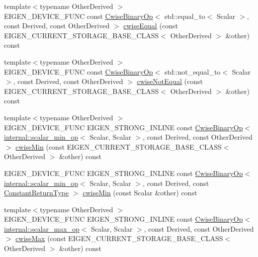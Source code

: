 \begin{DoxyCompactItemize}
\item 
{\footnotesize template$<$typename Other\+Derived $>$ }\\E\+I\+G\+E\+N\+\_\+\+D\+E\+V\+I\+C\+E\+\_\+\+F\+U\+NC const \mbox{\hyperlink{class_eigen_1_1_cwise_binary_op}{Cwise\+Binary\+Op}}$<$ std\+::equal\+\_\+to$<$ Scalar $>$, const Derived, const Other\+Derived $>$ \mbox{\hyperlink{class_eigen_1_1_array_base_a5bce24aa0762399c48cde7777c21c9e2}{cwise\+Equal}} (const E\+I\+G\+E\+N\+\_\+\+C\+U\+R\+R\+E\+N\+T\+\_\+\+S\+T\+O\+R\+A\+G\+E\+\_\+\+B\+A\+S\+E\+\_\+\+C\+L\+A\+SS$<$ Other\+Derived $>$ \&other) const
\item 
{\footnotesize template$<$typename Other\+Derived $>$ }\\E\+I\+G\+E\+N\+\_\+\+D\+E\+V\+I\+C\+E\+\_\+\+F\+U\+NC const \mbox{\hyperlink{class_eigen_1_1_cwise_binary_op}{Cwise\+Binary\+Op}}$<$ std\+::not\+\_\+equal\+\_\+to$<$ Scalar $>$, const Derived, const Other\+Derived $>$ \mbox{\hyperlink{class_eigen_1_1_array_base_a69fb89b5cc84d7043cce9df0f371ed10}{cwise\+Not\+Equal}} (const E\+I\+G\+E\+N\+\_\+\+C\+U\+R\+R\+E\+N\+T\+\_\+\+S\+T\+O\+R\+A\+G\+E\+\_\+\+B\+A\+S\+E\+\_\+\+C\+L\+A\+SS$<$ Other\+Derived $>$ \&other) const
\item 
{\footnotesize template$<$typename Other\+Derived $>$ }\\E\+I\+G\+E\+N\+\_\+\+D\+E\+V\+I\+C\+E\+\_\+\+F\+U\+NC E\+I\+G\+E\+N\+\_\+\+S\+T\+R\+O\+N\+G\+\_\+\+I\+N\+L\+I\+NE const \mbox{\hyperlink{class_eigen_1_1_cwise_binary_op}{Cwise\+Binary\+Op}}$<$ \mbox{\hyperlink{struct_eigen_1_1internal_1_1scalar__min__op}{internal\+::scalar\+\_\+min\+\_\+op}}$<$ Scalar, Scalar $>$, const Derived, const Other\+Derived $>$ \mbox{\hyperlink{class_eigen_1_1_array_base_a6240050ea0f5fc52d5ed3d6252e4bbcd}{cwise\+Min}} (const E\+I\+G\+E\+N\+\_\+\+C\+U\+R\+R\+E\+N\+T\+\_\+\+S\+T\+O\+R\+A\+G\+E\+\_\+\+B\+A\+S\+E\+\_\+\+C\+L\+A\+SS$<$ Other\+Derived $>$ \&other) const
\item 
E\+I\+G\+E\+N\+\_\+\+D\+E\+V\+I\+C\+E\+\_\+\+F\+U\+NC E\+I\+G\+E\+N\+\_\+\+S\+T\+R\+O\+N\+G\+\_\+\+I\+N\+L\+I\+NE const \mbox{\hyperlink{class_eigen_1_1_cwise_binary_op}{Cwise\+Binary\+Op}}$<$ \mbox{\hyperlink{struct_eigen_1_1internal_1_1scalar__min__op}{internal\+::scalar\+\_\+min\+\_\+op}}$<$ Scalar, Scalar $>$, const Derived, const \mbox{\hyperlink{class_eigen_1_1_cwise_nullary_op}{Constant\+Return\+Type}} $>$ \mbox{\hyperlink{class_eigen_1_1_array_base_ad849f92841311f48355283164344c753}{cwise\+Min}} (const Scalar \&other) const
\item 
{\footnotesize template$<$typename Other\+Derived $>$ }\\E\+I\+G\+E\+N\+\_\+\+D\+E\+V\+I\+C\+E\+\_\+\+F\+U\+NC E\+I\+G\+E\+N\+\_\+\+S\+T\+R\+O\+N\+G\+\_\+\+I\+N\+L\+I\+NE const \mbox{\hyperlink{class_eigen_1_1_cwise_binary_op}{Cwise\+Binary\+Op}}$<$ \mbox{\hyperlink{struct_eigen_1_1internal_1_1scalar__max__op}{internal\+::scalar\+\_\+max\+\_\+op}}$<$ Scalar, Scalar $>$, const Derived, const Other\+Derived $>$ \mbox{\hyperlink{class_eigen_1_1_array_base_a1f4b05bb0a90346314efc168e81b3add}{cwise\+Max}} (const E\+I\+G\+E\+N\+\_\+\+C\+U\+R\+R\+E\+N\+T\+\_\+\+S\+T\+O\+R\+A\+G\+E\+\_\+\+B\+A\+S\+E\+\_\+\+C\+L\+A\+SS$<$ Other\+Derived $>$ \&other) const

\end{DoxyCompactItemize}
